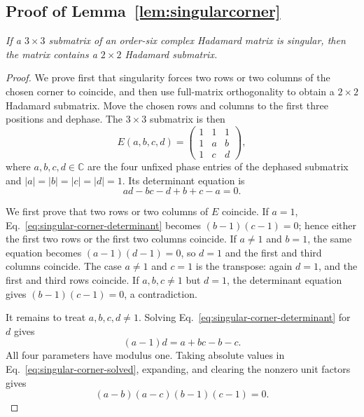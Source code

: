 \documentclass[aps,prx,reprint,nofootinbib,twoside,superscriptaddress,longbibliography,floatfix]{revtex4-2}
\theoremstyle{definition}
\newcommand{\C}{\mathbb C}
\begin{document}
\subsection{{Proof of Lemma~\ref{lem:singularcorner}}}
\label{sec:supp-singular-corner}

{\emph{If a $3\times3$ submatrix of an order-six complex Hadamard matrix is singular, then the matrix contains a $2\times2$ Hadamard submatrix.}}

\begin{proof}
We prove first that singularity forces two rows or two columns of the chosen corner to coincide, and then use full-matrix orthogonality to obtain a $2\times2$ Hadamard submatrix. Move the chosen rows and columns to the first three positions and dephase. The $3\times3$ submatrix is then
\begin{equation}
E(a,b,c,d)=\begin{pmatrix}1&1&1\\1&a&b\\1&c&d\end{pmatrix},
\label{eq:supp-singular-corner-form}
\end{equation}
where $a,b,c,d\in\C$ are the four unfixed phase entries of the dephased submatrix and $|a|=|b|=|c|=|d|=1$.  Its determinant equation is
\begin{equation}
ad-bc-d+b+c-a=0.
\label{eq:singular-corner-determinant}
\end{equation}

We first prove that two rows or two columns of $E$ coincide.  If $a=1$, Eq.~\eqref{eq:singular-corner-determinant} becomes $(b-1)(c-1)=0$; hence either the first two rows or the first two columns coincide. If $a\ne1$ and $b=1$, the same equation becomes $(a-1)(d-1)=0$, so $d=1$ and the first and third columns coincide. The case $a\ne1$ and $c=1$ is the transpose: again $d=1$, and the first and third rows coincide. If $a,b,c\ne1$ but $d=1$, the determinant equation gives $(b-1)(c-1)=0$, a contradiction.

It remains to treat $a,b,c,d\ne1$. Solving Eq.~\eqref{eq:singular-corner-determinant} for $d$ gives
\begin{equation}
(a-1)d=a+bc-b-c.
\label{eq:singular-corner-solved}
\end{equation}
All four parameters have modulus one. Taking absolute values in Eq.~\eqref{eq:singular-corner-solved}, expanding, and clearing the nonzero unit factors gives
\begin{equation}
(a-b)(a-c)(b-1)(c-1)=0.
\label{eq:singular-corner-factor}
\end{equation}


\end{proof}
\end{document}

